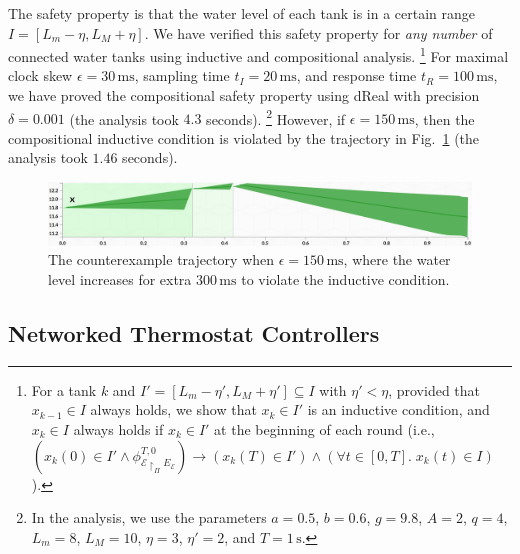 The safety property is that the water level of each tank is in a certain range
$I = [L_m - \eta, L_M + \eta]$.
%
We have verified this safety property for  \emph{any number} of connected water tanks 
using inductive and compositional analysis.%
\footnote{For a tank $k$ and %
$I' = [L_m - \eta', L_M + \eta']\subseteq I$ with $\eta' < \eta$,
provided  that $x_{k-1} \in I$ always holds, %
we show that $x_{k} \in I'$ is an inductive condition,
and  $x_{k} \in I$ always holds
if $x_{k} \in I'$ at the beginning of each round
(i.e., $(x_k(0) \in I' \wedge \phi_{\mathcal{E} \restriction_{\Pi}
  E_\mathcal{E}}^{T,0}) \rightarrow (x_k(T) \in I') \wedge (\forall t
\in [0,T].\; x_{k}(t) \in I)$).} 
%
For  maximal clock skew $\epsilon = 30\,\mathrm{ms}$,
 sampling time $t_I = 20\,\mathrm{ms}$,
and  response time $t_R = 100\,\mathrm{ms}$,
we have proved the  compositional safety property
 using \textsf{dReal} with precision $\delta = 0.001$ (the analysis took $4.3$ seconds).%
 \footnote{In the analysis, we use the parameters 
$a = 0.5$, $b = 0.6$, $g = 9.8$, $A = 2$, $q = 4$, $L_m = 8$, $L_M = 10$,
$\eta = 3$, $\eta' = 2$, and $T = 1\,\mathrm{s}$.}
However, if $\epsilon = 150\,\mathrm{ms}$,
then the compositional inductive condition is violated by the trajectory in Fig.~\ref{fig:water-error}
(the analysis took $1.46$ seconds).

\begin{figure}
\centering
\includegraphics[clip=true,trim=1ex 1ex 1ex 1ex,width=\columnwidth]{water-error.png}    
\caption{The counterexample trajectory when $\epsilon = 150\,\mathrm{ms}$,
where the water level increases for extra $300\,\mathrm{ms}$ to violate the inductive condition. %
} \label{fig:water-error}
\end{figure}





\subsection{Networked Thermostat Controllers}

